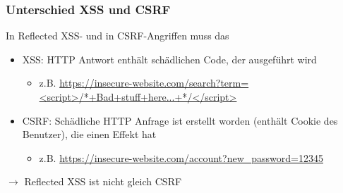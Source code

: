 \subsubsection*{Unterschied XSS und CSRF}
 In Reflected XSS- und in CSRF-Angriffen muss das \\
\begin{itemize}
    \item XSS: HTTP Antwort enthält schädlichen Code, der  ausgeführt wird
    \begin{itemize}
        \item z.B. \url{https://insecure-website.com/search?term=<script>/*+Bad+stuff+here...+*/</script>}
    \end{itemize}
    \item CSRF: Schädliche HTTP Anfrage ist erstellt worden (enthält Cookie des Benutzer), die einen  Effekt hat
    \begin{itemize}
        \item z.B. \url{https://insecure-website.com/account?new_password=12345}
    \end{itemize}
\end{itemize}
$\rightarrow$ Reflected XSS ist nicht gleich CSRF
